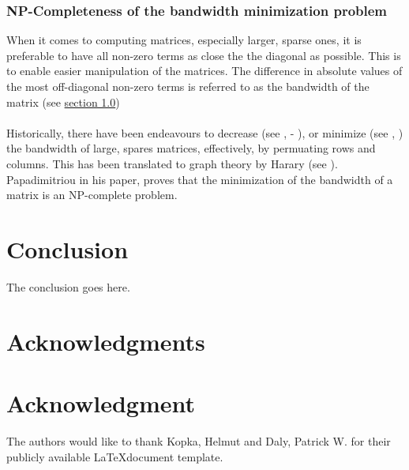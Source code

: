 \documentclass[conference,compsoc]{IEEEtran}
\begin{document}
\subsubsection{NP-Completeness of the bandwidth minimization problem}
When it comes to computing matrices, especially larger, sparse ones, it is preferable to have all non-zero terms as close the the diagonal as possible. This is to enable easier manipulation of the matrices. The difference in absolute values of the most off-diagonal non-zero terms is referred to as the bandwidth of the matrix (see \hyperref[intro]{section 1.0})
\\
\\
Historically, there have been endeavours to decrease (see \cite{10.1145/800195.805928}, - \cite{sparse}), or minimize (see \cite{chen}, \cite{chen2}) the bandwidth of large, spares matrices, effectively, by permuating rows and columns. This has been translated to graph theory by Harary (see \cite{1973141}). 
Papadimitriou in his paper, proves that the minimization of the bandwidth of a matrix is an NP-complete problem. \cite{papadimitriou_1976}


\section{Conclusion}
The conclusion goes here.



\ifCLASSOPTIONcompsoc
  \section*{Acknowledgments}
\else
  \section*{Acknowledgment}
\fi


The authors would like to thank Kopka, Helmut and Daly, Patrick W. \cite{10.5555/940746} for their 
publicly available \LaTeX document template.







\end{document}

